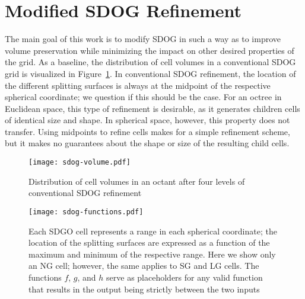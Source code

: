\section{Modified SDOG Refinement} \label{chap:4:modified}
The main goal of this work is to modify SDOG in such a way as to improve volume preservation while minimizing the impact on other desired properties of the grid.
As a baseline, the distribution of cell volumes in a conventional SDOG grid is visualized in Figure~\ref{fig:sdog-volume}.
In conventional SDOG refinement, the location of the different splitting surfaces is always at the midpoint of the respective spherical coordinate; we question if this should be the case.
For an octree in Euclidean space, this type of refinement is desirable, as it generates children cells of identical size and shape.
In spherical space, however, this property does not transfer.
Using midpoints to refine cells makes for a simple refinement scheme, but it makes no guarantees about the shape or size of the resulting child cells.


\begin{figure}[ht!]
	\centering
	\texttt{[image: sdog-volume.pdf]}
	\caption[Title]{
		Distribution of cell volumes in an octant after four levels of conventional SDOG refinement
	}
	\label{fig:sdog-volume}
\end{figure}


\begin{figure}[ht!]
	\centering
	\texttt{[image: sdog-functions.pdf]}
	\caption[Title]{
		Each SDGO cell represents a range in each spherical coordinate; the location of the splitting surfaces are expressed as a function of the maximum and minimum of the respective range.
		Here we show only an NG cell; however, the same applies to SG and LG cells.
		The functions $f$, $g$, and $h$ serve as placeholders for any valid function that results in the output being strictly between the two inputs
	}
	\label{fig:functions}
\end{figure}


